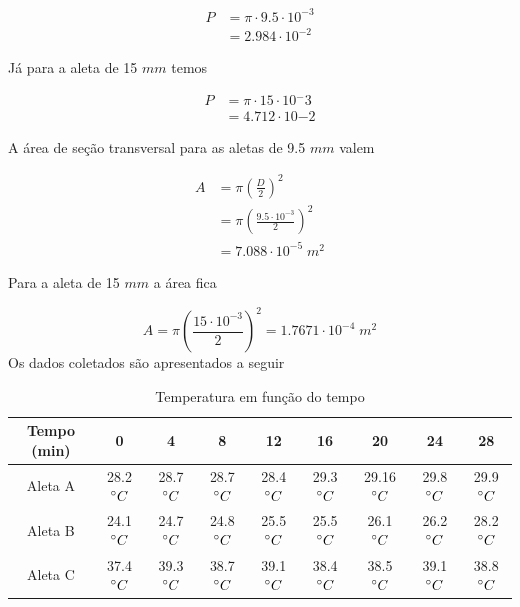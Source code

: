 \documentclass[12pt,openright,twoside,a4paper]{abntex2}
\begin{document}
\begin{align}
	P & = \pi \cdot 9.5 \cdot 10^{-3} \\
	  & = 2.984 \cdot 10^{-2}
\end{align}

Já para a aleta de 15 \(mm\) temos

\begin{align}
	P & = \pi \cdot 15 \cdot 10 {^-3} \\
	  & = 4.712 \cdot 10{-2}
\end{align}

A área de seção transversal para as aletas de 9.5 \(mm\) valem

\begin{align}
	A & = \pi \left( \frac{D}{2} \right)^2                 \\
	  & = \pi \left( \frac{9.5 \cdot 10^{-3}}{2} \right)^2 \\
	  & = 7.088 \cdot10 ^{-5} \; m^2
\end{align}

Para a aleta de 15  \(mm\)  a área fica

\begin{equation}
	A = \pi \left( \frac{15 \cdot 10^{-3}}{2} \right)^2 = 1.7671 \cdot 10^{-4} \; m^2
\end{equation}
Os dados coletados são apresentados a seguir

\begin{table}[H]
	\centering
	\caption{Temperatura em função do tempo}
	\begin{adjustbox}{width=0.95\textwidth,center=\textwidth}
		\begin{tabular}{c|c|c|c|c|c|c|c|c}
			\toprule
			Tempo (min) & 0                  & 4                  & 8                  & 12                 & 16                 & 20                  & 24                  & 28                 \\
			\midrule
			Aleta A     & 28.2 \(\degree C\) & 28.7 \(\degree C\) & 28.7 \(\degree C\) & 28.4 \(\degree C\) & 29.3 \(\degree C\) & 29.16 \(\degree C\) & 29.8 \(\degree  C\) & 29.9\(\degree C\)  \\
			Aleta B     & 24.1 \(\degree C\) & 24.7 \(\degree C\) & 24.8 \(\degree C\) & 25.5 \(\degree C\) & 25.5 \(\degree C\) & 26.1 \(\degree C\)  & 26.2 \(\degree  C\) & 28.2\(\degree C\)  \\
			Aleta C     & 37.4 \(\degree C\) & 39.3 \(\degree C\) & 38.7 \(\degree C\) & 39.1 \(\degree C\) & 38.4 \(\degree C\) & 38.5 \(\degree  C\) & 39.1 \(\degree  C\) & 38.8 \(\degree C\) \\
			
			\bottomrule
		\end{tabular}
	\end{adjustbox}
	\label{tab:temp_tempo}
\end{table}
\end{document}
